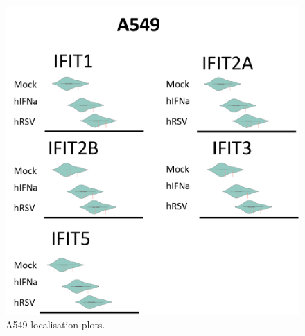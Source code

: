 \begin{figure}
    \centering
    \includegraphics[width=1\linewidth]{06. Chapter 1/Figs/02. Localisation/02. a549 plots.png}
    \caption[A549 localisation plots.]{A549 localisation plots.}
    \label{A549 localisation plots.}
\end{figure}


